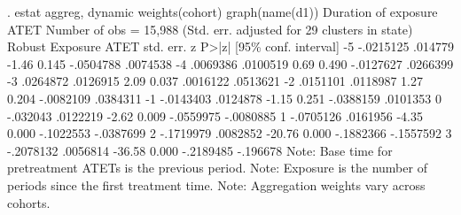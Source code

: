 . estat aggreg, dynamic weights(cohort) graph(name(d1))
{\smallskip}
Duration of exposure ATET                               Number of obs = 15,988
{\smallskip}
                                 (Std. err. adjusted for 29 clusters in state)
             {\VBAR}               Robust
    Exposure {\VBAR}       ATET   std. err.      z    P>|z|     [95\% conf. interval]
          -5 {\VBAR}  -.0215125    .014779    -1.46   0.145    -.0504788    .0074538
          -4 {\VBAR}   .0069386   .0100519     0.69   0.490    -.0127627    .0266399
          -3 {\VBAR}   .0264872   .0126915     2.09   0.037     .0016122    .0513621
          -2 {\VBAR}   .0151101   .0118987     1.27   0.204    -.0082109    .0384311
          -1 {\VBAR}  -.0143403   .0124878    -1.15   0.251    -.0388159    .0101353
           0 {\VBAR}   -.032043   .0122219    -2.62   0.009    -.0559975   -.0080885
           1 {\VBAR}  -.0705126   .0161956    -4.35   0.000    -.1022553   -.0387699
           2 {\VBAR}  -.1719979   .0082852   -20.76   0.000    -.1882366   -.1557592
           3 {\VBAR}  -.2078132   .0056814   -36.58   0.000    -.2189485    -.196678
Note: Base time for pretreatment ATETs is the previous period.
Note: Exposure is the number of periods since the first treatment time.
Note: Aggregation weights vary across cohorts.
